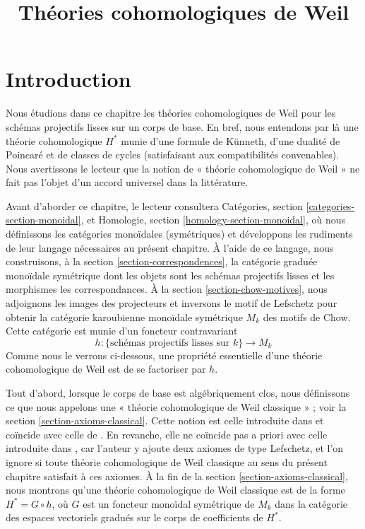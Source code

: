 

%


\title{Théories cohomologiques de Weil}


\maketitle

\label{section-phantom}

\tableofcontents



\section{Introduction}
\label{section-introduction}

\noindent
Nous étudions dans ce chapitre les théories cohomologiques de Weil pour les schémas
projectifs lisses sur un corps de base. En bref, nous entendons par là une théorie
cohomologique $H^*$ munie d'une formule de K\"unneth, d'une dualité de Poincar\'e
et de classes de cycles (satisfaisant aux compatibilités convenables). Nous
avertissons le lecteur que la notion de « théorie cohomologique de Weil »
ne fait pas l'objet d'un accord universel dans la littérature.

\medskip\noindent
Avant d'aborder ce chapitre, le lecteur consultera
Catégories, section \ref{categories-section-monoidal}, et
Homologie, section \ref{homology-section-monoidal}, où
nous définissons les catégories monoïdales (symétriques) et développons
les rudiments de leur langage nécessaires au présent chapitre.
À l'aide de ce langage, nous construisons, à la
section \ref{section-correspondences}, la catégorie graduée monoïdale
symétrique dont les objets sont les schémas projectifs lisses et
les morphismes les correspondances. À la section \ref{section-chow-motives},
nous adjoignons les images des projecteurs et inversons le motif de Lefschetz
pour obtenir la catégorie karoubienne monoïdale symétrique $M_k$
des motifs de Chow. Cette catégorie est munie d'un foncteur contravariant
$$
h : \{\text{schémas projectifs lisses sur }k\} \longrightarrow M_k
$$
Comme nous le verrons ci-dessous, une propriété essentielle d'une théorie
cohomologique de Weil est de se factoriser par $h$.

\medskip\noindent
Tout d'abord, lorsque le corps de base est algébriquement clos, nous définissons
ce que nous appelons une « théorie cohomologique de Weil classique » ;
voir la section \ref{section-axioms-classical}. Cette notion est
celle introduite dans \cite[section 1.2]{Kleiman-cycles} et
coïncide avec celle de \cite[page 65]{Kleiman-motives}.
En revanche, elle ne coïncide pas a priori avec celle introduite dans
\cite[page 10]{Kleiman-standard}, car l'auteur y ajoute deux axiomes
de type Lefschetz, et l'on ignore si toute théorie cohomologique de Weil
classique au sens du présent chapitre satisfait à ces axiomes.
À la fin de la section \ref{section-axioms-classical}, nous montrons
qu'une théorie cohomologique de Weil classique est de la forme $H^* = G \circ h$,
où $G$ est un foncteur monoïdal symétrique de $M_k$ dans la catégorie
des espaces vectoriels gradués sur le corps de coefficients de $H^*$.

